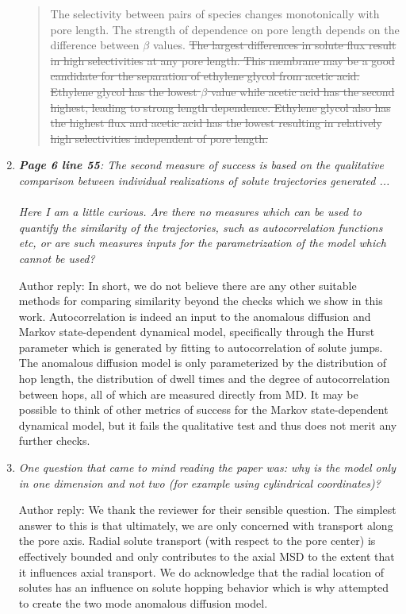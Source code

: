 \documentclass{article}
\begin{document}
\begin{enumerate}[label={Comment \theenumi :}, leftmargin=3.9\parindent]
\begin{quote}
          The selectivity between pairs of species changes monotonically with
	      pore length. The strength of dependence on pore length depends on
	      the difference between $\beta$ values. 
	      \sout{The largest differences in solute
	      flux result in high selectivities at any pore length. This membrane
	      may be a good candidate for the separation of ethylene glycol from
	      acetic acid. Ethylene glycol has the lowest $\beta$ value while
	      acetic acid has the second highest, leading to strong length
	      dependence. Ethylene glycol also has the highest flux and acetic acid
	      has the lowest resulting in relatively high selectivities independent
	      of pore length.}
	  
        \end{quote}
		
  \item \textit{\textbf{Page 6 line 55}: The second measure of success is based on the qualitative
        comparison between individual realizations of solute trajectories generated ...\\ \\
		Here I am a little curious. Are there no measures which can be used to quantify the similarity of
		the trajectories, such as autocorrelation functions etc, or are such measures inputs for the
		parametrization of the model which cannot be used?}
		
		Author reply: In short, we do not believe there are any other suitable methods for comparing
		similarity beyond the checks which we show in this work. Autocorrelation is indeed an input 
		to the anomalous diffusion and Markov state-dependent dynamical model, specifically through
		the Hurst parameter which is generated by fitting to autocorrelation of solute jumps. The
		anomalous diffusion model is only parameterized by the distribution of hop length, the 
		distribution of dwell times and the degree of autocorrelation between hops, all of which
		are measured directly from MD. It may be possible to think of other metrics of success
		for the Markov state-dependent dynamical model, but it fails the qualitative test and
		thus does not merit any further checks.
		
  \item \textit{One question that came to mind reading the paper was: why is the model only in 
  		one dimension and not two (for example using cylindrical coordinates)?}
  		
  		Author reply: We thank the reviewer for their sensible question. The simplest answer
  		to this is that ultimately, we are only concerned with transport along the pore axis. Radial
  		solute transport (with respect to the pore center) is effectively bounded and only 
  		contributes to the axial MSD to the extent that it influences axial transport. We 
  		do acknowledge that the radial location of solutes has an influence on solute
  		hopping behavior which is why attempted to create the two mode anomalous diffusion model.
		

\end{enumerate}
\end{document}
